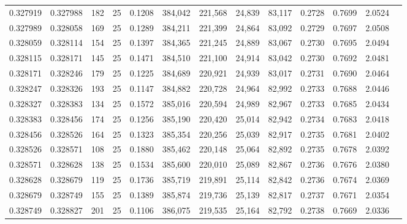 \begin{tabular}{rrrrrrrrrrrrr}
0.327919 & 0.327988 &   182 &  25 &                                     0.1208 & 384,042 & 221,568 &  24,839 &  83,117 & 0.2728 & 0.7699 & 2.0524 \\
0.327989 & 0.328058 &   169 &  25 &                                     0.1289 & 384,211 & 221,399 &  24,864 &  83,092 & 0.2729 & 0.7697 & 2.0508 \\
0.328059 & 0.328114 &   154 &  25 &                                     0.1397 & 384,365 & 221,245 &  24,889 &  83,067 & 0.2730 & 0.7695 & 2.0494 \\
0.328115 & 0.328171 &   145 &  25 &                                     0.1471 & 384,510 & 221,100 &  24,914 &  83,042 & 0.2730 & 0.7692 & 2.0481 \\
0.328171 & 0.328246 &   179 &  25 &                                     0.1225 & 384,689 & 220,921 &  24,939 &  83,017 & 0.2731 & 0.7690 & 2.0464 \\
0.328247 & 0.328326 &   193 &  25 &                                     0.1147 & 384,882 & 220,728 &  24,964 &  82,992 & 0.2733 & 0.7688 & 2.0446 \\
0.328327 & 0.328383 &   134 &  25 &                                     0.1572 & 385,016 & 220,594 &  24,989 &  82,967 & 0.2733 & 0.7685 & 2.0434 \\
0.328383 & 0.328456 &   174 &  25 &                                     0.1256 & 385,190 & 220,420 &  25,014 &  82,942 & 0.2734 & 0.7683 & 2.0418 \\
0.328456 & 0.328526 &   164 &  25 &                                     0.1323 & 385,354 & 220,256 &  25,039 &  82,917 & 0.2735 & 0.7681 & 2.0402 \\
0.328526 & 0.328571 &   108 &  25 &                                     0.1880 & 385,462 & 220,148 &  25,064 &  82,892 & 0.2735 & 0.7678 & 2.0392 \\
0.328571 & 0.328628 &   138 &  25 &                                     0.1534 & 385,600 & 220,010 &  25,089 &  82,867 & 0.2736 & 0.7676 & 2.0380 \\
0.328628 & 0.328679 &   119 &  25 &                                     0.1736 & 385,719 & 219,891 &  25,114 &  82,842 & 0.2736 & 0.7674 & 2.0369 \\
0.328679 & 0.328749 &   155 &  25 &                                     0.1389 & 385,874 & 219,736 &  25,139 &  82,817 & 0.2737 & 0.7671 & 2.0354 \\
0.328749 & 0.328827 &   201 &  25 &                                     0.1106 & 386,075 & 219,535 &  25,164 &  82,792 & 0.2738 & 0.7669 & 2.0336 \\

\end{tabular}
